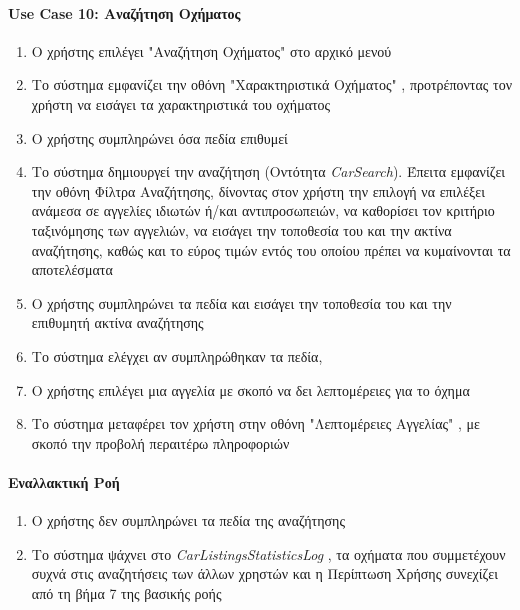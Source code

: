 \documentclass{../ol-softwaremanual}
\begin{document}
	
	\paragraph{\en Use Case 10: \gr Αναζήτηση Οχήματος}  
	\begin{enumerate}
		\item Ο χρήστης επιλέγει \en"\gr Αναζήτηση Οχήματος\en" \gr στο αρχικό μενού
		\item Το σύστημα εμφανίζει την οθόνη \en"\gr Χαρακτηριστικά Οχήματος\en" \gr, προτρέποντας τον χρήστη να εισάγει τα χαρακτηριστικά του οχήματος 
		\item Ο χρήστης συμπληρώνει όσα πεδία επιθυμεί
		\item Το σύστημα δημιουργεί την αναζήτηση (Οντότητα \en \textit{CarSearch}\gr). Έπειτα εμφανίζει την οθόνη Φίλτρα Αναζήτησης, δίνοντας στον χρήστη την επιλογή να επιλέξει ανάμεσα σε αγγελίες ιδιωτών ή/και αντιπροσωπειών, να καθορίσει τον κριτήριο ταξινόμησης των αγγελιών, να εισάγει την τοποθεσία του και την ακτίνα αναζήτησης, καθώς και το εύρος τιμών εντός του οποίου πρέπει να κυμαίνονται τα αποτελέσματα
		\item Ο χρήστης συμπληρώνει τα πεδία και εισάγει την τοποθεσία του και την επιθυμητή ακτίνα αναζήτησης
		\item Το σύστημα ελέγχει αν συμπληρώθηκαν τα πεδία, 
		\item Ο χρήστης επιλέγει μια αγγελία με σκοπό να δει λεπτομέρειες για το όχημα
		\item Το σύστημα  μεταφέρει τον χρήστη στην οθόνη \en"\gr Λεπτομέρειες Αγγελίας\en" \gr, με σκοπό την προβολή περαιτέρω πληροφοριών	
	\end{enumerate}
	
	
	\paragraph{Εναλλακτική Ροή}
		\begin{enumerate}
			\item Ο χρήστης δεν συμπληρώνει τα πεδία της αναζήτησης
			\item Το σύστημα ψάχνει στο \en \textit{CarListingsStatisticsLog} \gr, τα οχήματα που συμμετέχουν συχνά στις αναζητήσεις των άλλων χρηστών και η Περίπτωση Χρήσης συνεχίζει από τη βήμα 7 της βασικής ροής
	\end{enumerate}
	
\end{document}
